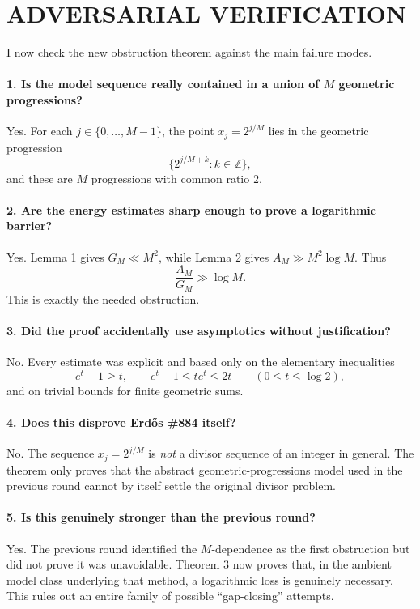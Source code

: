 \section{ADVERSARIAL VERIFICATION}

I now check the new obstruction theorem against the main failure modes.

\paragraph{1. Is the model sequence really contained in a union of \(M\) geometric progressions?}
Yes. For each \(j\in\{0,\dots,M-1\}\), the point \(x_j=2^{j/M}\) lies in the geometric progression
\[
\{2^{j/M+k}:k\in \mathbb Z\},
\]
and these are \(M\) progressions with common ratio \(2\).

\paragraph{2. Are the energy estimates sharp enough to prove a logarithmic barrier?}
Yes. Lemma 1 gives \(G_M\ll M^2\), while Lemma 2 gives \(A_M\gg M^2\log M\). Thus
\[
\frac{A_M}{G_M}\gg \log M.
\]
This is exactly the needed obstruction.

\paragraph{3. Did the proof accidentally use asymptotics without justification?}
No. Every estimate was explicit and based only on the elementary inequalities
\[
e^t-1\ge t,
\qquad
e^t-1\le te^t\le 2t 
\qquad (0\le t\le \log 2),
\]
and on trivial bounds for finite geometric sums.

\paragraph{4. Does this disprove Erd\H{o}s \#884 itself?}
No. The sequence \(x_j=2^{j/M}\) is \emph{not} a divisor sequence of an integer in general. The theorem only proves that the abstract geometric-progressions model used in the previous round cannot by itself settle the original divisor problem.

\paragraph{5. Is this genuinely stronger than the previous round?}
Yes. The previous round identified the \(M\)-dependence as the first obstruction but did not prove it was unavoidable. Theorem 3 now proves that, in the ambient model class underlying that method, a logarithmic loss is genuinely necessary. This rules out an entire family of possible ``gap-closing'' attempts.

